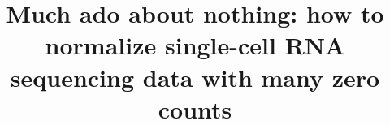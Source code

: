 \documentclass{bmcart}
\begin{document}
\begin{frontmatter}

\begin{fmbox}


\title{Much ado about nothing: how to normalize single-cell RNA sequencing data with many zero counts}


\author[
   addressref={aff1},
   corref={aff1},
   email={aaron.lun@cruk.cam.ac.uk}   
]{ }
\author[
   addressref={aff2},
   email={kbach@ebi.ac.uk}
]{ }
\author[
    addressref={aff1,aff2},
    email={marioni@ebi.ac.uk}
]{ }


\address[id=aff1]{%
  ,
  ,                     %
  ,                        %
  ,                              %
}
\address[id=aff2]{%
  ,
  ,
  ,
}


\end{fmbox}
\end{frontmatter}
\end{document}
